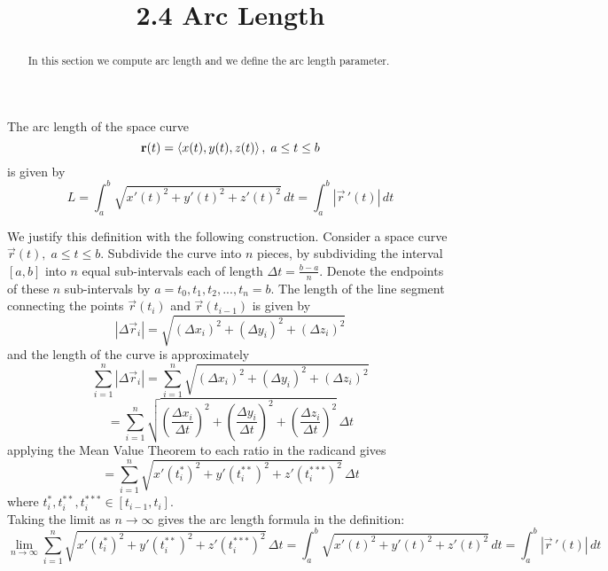 \documentclass[handout]{ximera}
\title{2.4 Arc Length}
\begin{document}
\begin{abstract}
In this section we compute arc length and we define the arc length parameter.
\end{abstract}

\maketitle


\begin{definition}
The arc length of the space curve
\[
\mathbf r(t) = \left\langle x(t), y(t), z(t)\right\rangle, \; a \leq t \leq b
\]
is given by
\[
L  = \int_a^b \sqrt{x'(t)^2 + y'(t)^2 +z'(t)^2}\, dt = \int_a^b |\vec r\,'(t)|\, dt
\]

\end{definition}


We justify this definition with the following construction. 
Consider a space curve $\vec r(t), \; a \leq t \leq b$.  Subdivide the curve into $n$ pieces, by subdividing the interval $[a, b]$ into $n$ equal 
sub-intervals each of length $\Delta t = \frac{b-a}{n}$. Denote the endpoints of these $n$ sub-intervals by $a = t_0, t_1, t_2, ..., t_n = b$.
The length of the line segment connecting the points $\vec r(t_i)$ and $\vec r(t_{i-1})$ is given by
\[
|\Delta \vec r_i| = \sqrt{(\Delta x_i) ^2 + (\Delta y_i)^2 + (\Delta z_i)^2}
\]
and the length of the curve is approximately
\[
\sum_{i = 1}^n |\Delta \vec r_i| = \sum_{i = 1}^n \sqrt{(\Delta x_i) ^2 + (\Delta y_i)^2 + (\Delta z_i)^2}
\]
\[
= \sum_{i = 1}^n \sqrt{\left(\frac{\Delta x_i}{\Delta t}\right)^2 + \left(\frac{\Delta y_i}{\Delta t}\right)^2 + \left(\frac{\Delta z_i}{\Delta t}\right)^2}\, \Delta t
\]
applying the Mean Value Theorem to each ratio in the radicand gives
\[
= \sum_{i = 1}^n \sqrt{x'(t_i^*)^2 + y'(t_i^{**})^2 + z'(t_i^{***})^2} \,\Delta t
\]
where $t_i^*, t_i^{**}, t_i^{***} \in [t_{i-1}, t_i]$.\\
Taking the limit as $n \to \infty$ gives the arc length formula in the definition:
\[
\lim_{n \to \infty} \sum_{i = 1}^n \sqrt{x'(t_i^*)^2 + y'(t_i^{**})^2 + z'(t_i^{***})^2} \,\Delta t  = \int_a^b \sqrt{x'(t)^2 + y'(t)^2 +z'(t)^2}\, dt  = \int_a^b |\vec r\,'(t)|\, dt
\]
\end{document}

